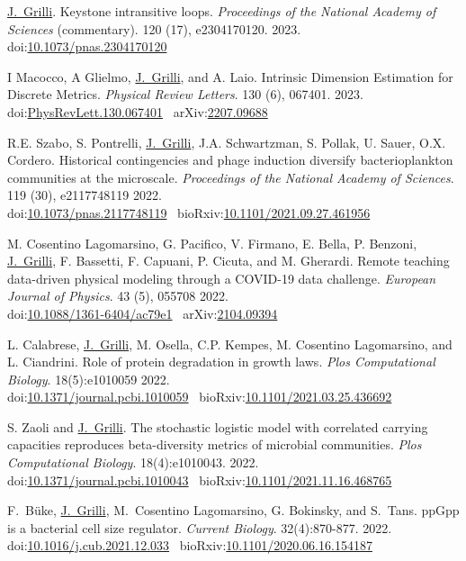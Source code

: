 \documentclass[10pt]{article}
\newcommand\JG{\underline{J.~Grilli}}
\newcommand\doilink[1]{\href{http://dx.doi.org/#1}{#1}}
\newcommand\doi[1]{doi:\doilink{#1}}
\newcommand\arxivlink[1]{\href{http://arxiv.org/abs/#1}{#1}}
\newcommand\arxiv[1]{arXiv:\arxivlink{#1}}
\newcommand\bioarxivlink[1]{\href{http://biorxiv.org/content/early/#1}{#1}}
\newcommand\bioarxiv[1]{bioRxiv:\bioarxivlink{#1}}
\begin{document}
\begin{bibenum}
    \item \JG.
    Keystone intransitive loops.
    \emph{Proceedings of the National Academy of Sciences} (commentary). 120 (17), e2304170120. 2023.
    \\
    \doi{10.1073/pnas.2304170120} 

    \item I Macocco, A Glielmo, \JG, and A. Laio.
    Intrinsic Dimension Estimation for Discrete Metrics.
    \emph{Physical Review Letters}.  130 (6), 067401. 2023.
    \\
    \doi{PhysRevLett.130.067401} \
    \arxiv{2207.09688}

    \item  R.E. Szabo,  S. Pontrelli,  \JG,  J.A. Schwartzman,  S. Pollak,  U. Sauer,  O.X. Cordero.
    Historical contingencies and phage induction diversify bacterioplankton communities at the microscale.
    \emph{Proceedings of the National Academy of Sciences}. 119 (30), e2117748119 2022.
    \\
    \doi{10.1073/pnas.2117748119} \
    \bioarxiv{10.1101/2021.09.27.461956}

    \item M. Cosentino Lagomarsino, G. Pacifico, V. Firmano, E. Bella, P. Benzoni, \JG, F. Bassetti, F. Capuani, P. Cicuta, and M. Gherardi.
    Remote teaching data-driven physical modeling through a COVID-19 data challenge.
    \emph{European Journal of Physics}. 43 (5), 055708 2022.
    \\
    \doi{10.1088/1361-6404/ac79e1} \
    \arxiv{2104.09394}


    \item L. Calabrese,  \JG, M. Osella, C.P. Kempes, M. Cosentino Lagomarsino, and L. Ciandrini.
    Role of protein degradation in growth laws.
    \emph{Plos Computational Biology}. 18(5):e1010059 2022.
    \\
    \doi{10.1371/journal.pcbi.1010059} \
    \bioarxiv{10.1101/2021.03.25.436692}

    \item S. Zaoli and \JG.
    The stochastic logistic model with correlated carrying capacities reproduces beta-diversity metrics of microbial communities.
    \emph{Plos Computational Biology}. 18(4):e1010043. 2022.
    \\
    \doi{10.1371/journal.pcbi.1010043} \
    \bioarxiv{10.1101/2021.11.16.468765}

    \item F.~B\"uke, \JG, M.~Cosentino Lagomarsino, G. Bokinsky, and S.~Tans.
	ppGpp is a bacterial cell size regulator. 
    \emph{Current Biology}. 32(4):870-877. 2022.
    \\
    \doi{10.1016/j.cub.2021.12.033} \
	\bioarxiv{10.1101/2020.06.16.154187}



\end{bibenum}
\end{document}
